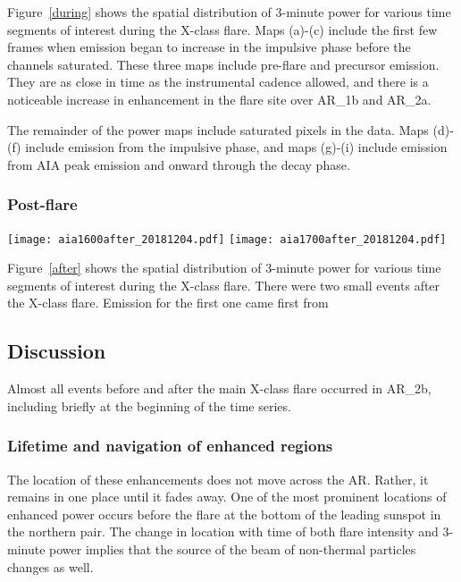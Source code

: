 \myfig Figure~\ref{during}
shows the spatial distribution of 3-minute power for
various time segments of interest during the X-class flare.
Maps (a)-(c) include the first few frames when emission began
to increase in the impulsive phase before the channels
saturated.
These three maps include pre-flare and precursor emission.
They are as close in time as the instrumental cadence allowed,
and there is a noticeable increase in enhancement in the flare site
over AR\_1b and AR\_2a.

The remainder of the power maps include saturated pixels in the data.
Maps (d)-(f) include emission from the impulsive phase,
and maps (g)-(i) include emission from AIA peak emission and
onward through the decay phase.

\subsubsection{Post-flare}
\begin{figure*}[htb!]\centering
    \texttt{[image: aia1600after\_20181204.pdf]}
    \texttt{[image: aia1700after\_20181204.pdf]}
    \caption{%
        Spatial distribution of 3-minute power after the X-class flare.
        \label{after}}
\end{figure*}
\myfig Figure~\ref{after}
shows the spatial distribution of 3-minute power for
various time segments of interest during the X-class flare.
There were two small events after the X-class flare.
Emission for the first one came first from

\subsection{Discussion}

Almost all events before and after the main X-class flare
occurred in AR\_2b, including briefly at the beginning of the time series.

\subsubsection{Lifetime and navigation of enhanced regions}
The location of these enhancements does not move across the AR.
Rather, it remains in one place until it fades away.
One of the most prominent locations of enhanced power occurs before
the flare at the bottom of the leading sunspot in the northern pair.
The change in location with time of both flare intensity and 3-minute power
implies that the source of the beam of non-thermal particles changes as well.

